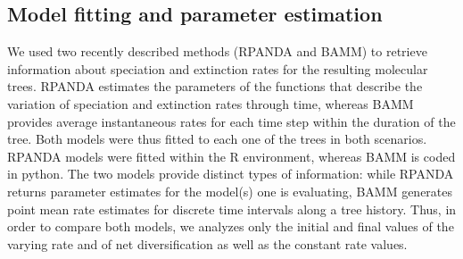 \documentclass[12pt,]{article}
\begin{document}
\subsection{Model fitting and parameter
estimation}\label{model-fitting-and-parameter-estimation}

We used two recently described methods (RPANDA and BAMM) to retrieve
information about speciation and extinction rates for the resulting
molecular trees. RPANDA estimates the parameters of the functions that
describe the variation of speciation and extinction rates through time,
whereas BAMM provides average instantaneous rates for each time step
within the duration of the tree. Both models were thus fitted to each
one of the trees in both scenarios. RPANDA models were fitted within the
R environment, whereas BAMM is coded in python. The two models provide
distinct types of information: while RPANDA returns parameter estimates
for the model(s) one is evaluating, BAMM generates point mean rate
estimates for discrete time intervals along a tree history. Thus, in
order to compare both models, we analyzes only the initial and final
values of the varying rate and of net diversification as well as the
constant rate values.
\end{document}
